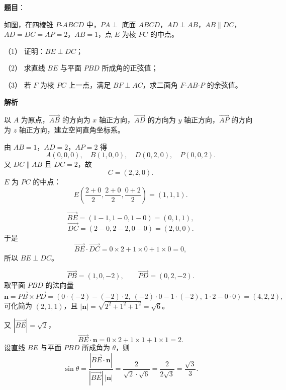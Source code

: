 \begin{answer}

\textbf{题目}：

如图，在四棱锥 $P\text{-}ABCD$ 中，$PA\perp$ 底面 $ABCD$，$AD\perp AB$，$AB\parallel DC$，$AD=DC=AP=2$，$AB=1$，点 $E$ 为棱 $PC$ 的中点。
\nopagebreak[4]
\begin{center}\end{center}
\nopagebreak[4]
（1） 证明：$BE\perp DC$；

（2） 求直线 $BE$ 与平面 $PBD$ 所成角的正弦值；

（3） 若 $F$ 为棱 $PC$ 上一点，满足 $BF\perp AC$，求二面角 $F\text{-}AB\text{-}P$ 的余弦值。

\textbf{解析}

以 $A$ 为原点，$\overrightarrow{AB}$ 的方向为 $x$ 轴正方向，$\overrightarrow{AD}$ 的方向为 $y$ 轴正方向，$\overrightarrow{AP}$ 的方向为 $z$ 轴正方向，建立空间直角坐标系。

由 $AB=1$，$AD=2$，$AP=2$ 得
\nopagebreak[4]
\[A(0,0,0),\quad B(1,0,0),\quad D(0,2,0),\quad P(0,0,2).\]
又 $DC\parallel AB$ 且 $DC=2$，故
\nopagebreak[4]
\[C=(2,2,0).\]
$E$ 为 $PC$ 的中点：
\nopagebreak[4]
\[E\left(\frac{2+0}{2},\frac{2+0}{2},\frac{0+2}{2}\right)=(1,1,1).\]


\nopagebreak[4]
\[\overrightarrow{BE}=(1-1,1-0,1-0)=(0,1,1),\]
\nopagebreak[4]
\[\overrightarrow{DC}=(2-0,2-2,0-0)=(2,0,0).\]
于是
\nopagebreak[4]
\[\overrightarrow{BE}\cdot\overrightarrow{DC}=0\times2+1\times0+1\times0=0,\]
所以 $BE\perp DC$。


\nopagebreak[4]
\[\overrightarrow{PB}=(1,0,-2),\qquad \overrightarrow{PD}=(0,2,-2).\]
取平面 $PBD$ 的法向量
\nopagebreak[4]
\[\boldsymbol n=\overrightarrow{PB}\times\overrightarrow{PD}
=(0\cdot(-2)-(-2)\cdot2,\ (-2)\cdot0-1\cdot(-2),\ 1\cdot2-0\cdot0)
=(4,2,2),\]
可化简为 $(2,1,1)$，且 $|\boldsymbol n|=\sqrt{2^2+1^2+1^2}=\sqrt6$。

又 $|\overrightarrow{BE}|=\sqrt2$，
\nopagebreak[4]
\[\overrightarrow{BE}\cdot\boldsymbol n=0\times2+1\times1+1\times1=2.\]
设直线 $BE$ 与平面 $PBD$ 所成角为 $\theta$，则
\nopagebreak[4]
\[\sin\theta=\frac{|\overrightarrow{BE}\cdot\boldsymbol n|}{|\overrightarrow{BE}|\,|\boldsymbol n|}
=\frac{2}{\sqrt2\cdot\sqrt6}=\frac{2}{2\sqrt3}=\frac{\sqrt3}{3}.\]


\end{answer}
